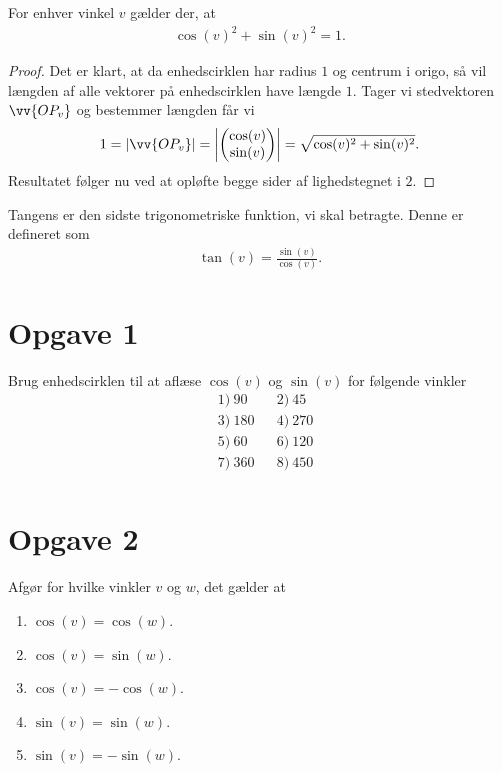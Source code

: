 \begin{setn}
For enhver vinkel $v$ gælder der, at 
\begin{align*}
 \cos(v)^2 + \sin(v)^2 = 1.
\end{align*}
\end{setn}
\begin{proof}
Det er klart, at da enhedscirklen har radius $1$ og centrum i origo, så vil længden af alle vektorer på enhedscirklen have længde $1$. Tager vi stedvektoren $\vv{OP_v}$ og bestemmer længden får vi
\begin{align*}
1 = |\vv{OP_v}| = \left|\begin{pmatrix} \cos(v)\\\sin(v)\end{pmatrix}\right| = \sqrt{\cos(v)^2+\sin(v)^2}.
\end{align*}
Resultatet følger nu ved at opløfte begge sider af lighedstegnet i $2$.
\end{proof}

Tangens er den sidste trigonometriske funktion, vi skal betragte. Denne er defineret som 
\begin{align*}
\tan(v) = \frac{\sin(v)}{\cos(v)}.
\end{align*}
\section{Opgave 1}
Brug enhedscirklen til at aflæse $\cos(v)$ og $\sin(v)$ for følgende vinkler
\begin{align*}
&1) \ 90  &&2) \ 45   \\
&3) \ 180   &&4) \ 270   \\
&5) \ 60  &&6) \ 120   \\
&7) \ 360  &&8) \ 450   \\
\end{align*}

\section*{Opgave 2}
Afgør for hvilke vinkler $v$ og $w$, det gælder at
\begin{enumerate}[label=\roman*)]
\item $\cos(v) = \cos(w)$. 
\item $\cos(v) = \sin(w)$.
\item $\cos(v) = -\cos(w)$.
\item $\sin(v) = \sin(w)$.
\item $\sin(v) = -\sin(w)$.
\end{enumerate}

